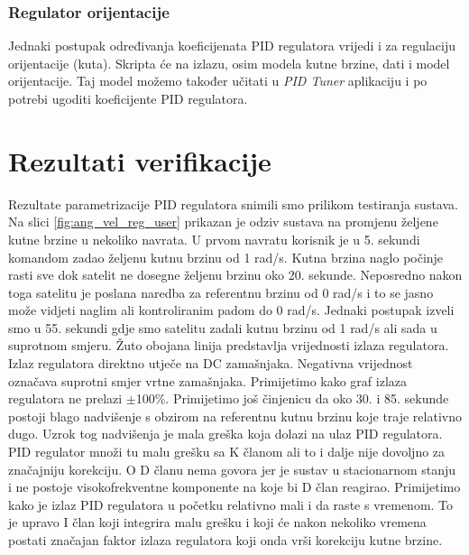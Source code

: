 \documentclass[times, utf8, diplomski, numeric]{templates/template}
\begin{document}
{{{            \subsubsection{Regulator orijentacije}{
                Jednaki postupak određivanja koeficijenata PID regulatora vrijedi i za regulaciju orijentacije (kuta). Skripta će na izlazu, osim modela kutne brzine, dati i model orijentacije. Taj model možemo također učitati u \emph{PID Tuner} aplikaciju i po potrebi ugoditi koeficijente PID regulatora.
            }
        }
    }

    \section{Rezultati verifikacije}{
        Rezultate parametrizacije PID regulatora snimili smo prilikom testiranja sustava. Na slici \ref{fig:ang_vel_reg_user} prikazan je odziv sustava na promjenu željene kutne brzine u nekoliko navrata. U prvom navratu korisnik je u 5. sekundi komandom zadao željenu kutnu brzinu od 1 rad/s. Kutna brzina naglo počinje rasti sve dok satelit ne dosegne željenu brzinu oko 20. sekunde. Neposredno nakon toga satelitu je poslana naredba za referentnu brzinu od 0 rad/s i to se jasno može vidjeti naglim ali kontroliranim padom do 0 rad/s. Jednaki postupak izveli smo u 55. sekundi gdje smo satelitu zadali kutnu brzinu od 1 rad/s ali sada u suprotnom smjeru. Žuto obojana linija predstavlja vrijednosti izlaza regulatora. Izlaz regulatora direktno utječe na DC zamašnjaka. Negativna vrijednost označava suprotni smjer vrtne zamašnjaka. Primijetimo kako graf izlaza regulatora ne prelazi $\pm$100\%. Primijetimo još činjenicu da oko 30. i 85. sekunde postoji blago nadvišenje s obzirom na referentnu kutnu brzinu koje traje relativno dugo. Uzrok tog nadvišenja je mala greška koja dolazi na ulaz PID regulatora. PID regulator množi tu malu grešku sa K članom ali to i dalje nije dovoljno za značajniju korekciju. O D članu nema govora jer je sustav u stacionarnom stanju i ne postoje visokofrekventne komponente na koje bi D član reagirao. Primijetimo kako je izlaz PID regulatora u početku relativno mali i da raste s vremenom. To je upravo I član koji integrira malu grešku i koji će nakon nekoliko vremena postati značajan faktor izlaza regulatora koji onda vrši korekciju kutne brzine. 

}}
\end{document}
